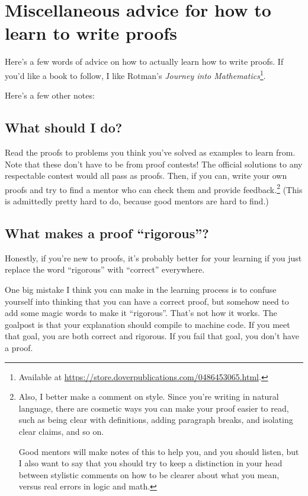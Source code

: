 \documentclass[11pt]{scrartcl}
\begin{document}
\section{Miscellaneous advice for how to learn to write proofs}
\label{sec:advice}

Here's a few words of advice on how to actually learn how to write proofs.
If you'd like a book to follow,
I like Rotman's \emph{Journey into Mathematics}\footnote{Available
at \url{https://store.doverpublications.com/0486453065.html}.}.

Here's a few other notes:

\subsection{What should I do?}
Read the proofs to problems you think you've solved as examples to learn from.
Note that these don’t have to be from proof contests!
The official solutions to any respectable contest would all pass as proofs.
Then, if you can, write your own proofs and
try to find a mentor who can check them and provide feedback.\footnote{Also,
  I better make a comment on style.
  Since you're writing in natural language,
  there are cosmetic ways you can make your proof easier to read,
  such as being clear with definitions, adding paragraph breaks,
  and isolating clear claims, and so on.

  Good mentors will make notes of this to help you, and you should listen,
  but I also want to say that you should try to keep a distinction in your head
  between stylistic comments on how to be clearer about what you mean,
  versus real errors in logic and math.}
(This is admittedly pretty hard to do, because good mentors are hard to find.)

\subsection{What makes a proof ``rigorous''?}
Honestly, if you're new to proofs,
it's probably better for your learning if you just replace the word
``rigorous'' with ``correct'' everywhere.

One big mistake I think you can make in the learning process
is to confuse yourself into thinking that you can have a correct proof,
but somehow need to add some magic words to make it ``rigorous''.
That's not how it works.
The goalpost is that your explanation should compile to machine code.
If you meet that goal, you are both correct and rigorous.
If you fail that goal, you don't have a proof.
\end{document}
